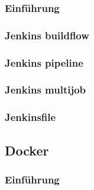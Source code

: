 \documentclass[apaper4,12p]{scrartcl}
\begin{document}
\subsubsection{Einführung}
\subsubsection{Jenkins buildflow}
\subsubsection{Jenkins pipeline}
\subsubsection{Jenkins multijob}
\subsubsection{Jenkinsfile}
\subsection{Docker}
\subsubsection{Einführung}
\end{document}
